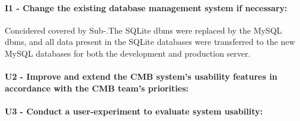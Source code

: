 \paragraph*{I1 - Change the existing database management system if necessary:} Concidered covered by Sub-.The SQLite \gls{dbms} were replaced by the MySQL \gls{dbms}, and all data present in the SQLite databases were transferred to the new MySQL databases for both the development and production server.

\paragraph*{U2 - Improve and extend the CMB system’s usability features in accordance with the CMB team’s priorities:}


\paragraph*{U3 - Conduct a user-experiment to evaluate system usability:}
